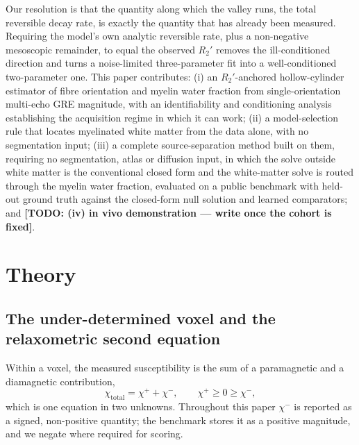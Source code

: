 \documentclass[AMA,STIX2COL,Linenumberson]{MRM}
\newcommand{\TODO}[1]{{\color{red}\textbf{[TODO: #1]}}}
\newcommand{\TODO}[1]{}
\begin{document}
Our resolution is that the quantity along which the valley runs, the total reversible decay rate, is exactly the quantity that has already been measured. Requiring the model's own analytic reversible rate, plus a non-negative mesoscopic remainder, to equal the observed $R_2'$ removes the ill-conditioned direction and turns a noise-limited three-parameter fit into a well-conditioned two-parameter one. This paper contributes: (i) an $R_2'$-anchored hollow-cylinder estimator of fibre orientation and myelin water fraction from single-orientation multi-echo GRE magnitude, with an identifiability and conditioning analysis establishing the acquisition regime in which it can work; (ii) a model-selection rule that locates myelinated white matter from the data alone, with no segmentation input; (iii) a complete source-separation method built on them, requiring no segmentation, atlas or diffusion input, in which the solve outside white matter is the conventional closed form and the white-matter solve is routed through the myelin water fraction, evaluated on a public benchmark with held-out ground truth against the closed-form null solution and learned comparators; and \TODO{(iv) in vivo demonstration --- write once the cohort is fixed}.


\section{Theory}

\subsection{The under-determined voxel and the relaxometric second equation}

Within a voxel, the measured susceptibility is the sum of a paramagnetic and a diamagnetic contribution,
\begin{equation}
\chi_{\mathrm{total}} = \chi^{+} + \chi^{-}, \qquad \chi^{+} \ge 0 \ge \chi^{-},
\label{eq:sum}
\end{equation}
which is one equation in two unknowns. Throughout this paper $\chi^{-}$ is reported as a signed, non-positive quantity; the benchmark stores it as a positive magnitude, and we negate where required for scoring.
\end{document}
